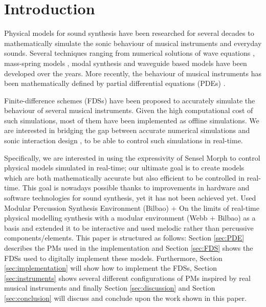 \documentclass{article}
\title{\papertitle}
\begin{document}
%
\capstartfalse
\maketitle
\capstarttrue
%
\begin{abstract}
In this paper we introduce several physical models of bowed string instruments which use accurate numerical simulations using partial differential equations but are also efficient enough to run in realtime. We describe the mathematical formulation of these models, the realtime implementation in JUCE, the control using the Sensel Morph interface as well as results from qualitative evaluations from experts.
\end{abstract}
%

\section{Introduction}\label{sec:introduction}

Physical models for sound synthesis have been researched for several decades to mathematically simulate the sonic behaviour of musical instruments and everyday sounds.
Several techniques ranging from numerical solutions of wave equations \cite{hiller1971synthesizing}, mass-spring models \cite{cadoz1993cordis}, modal synthesis \cite{morrison1993mosaic} and waveguide based models \cite{smith1992physical} have been developed over the years.
More recently, the behaviour of musical instruments has been mathematically defined by partial differential equations (PDEs) \cite{Bilbao2018:Tutorial}.

Finite-difference schemes (FDSs) have been proposed to accurately simulate the behaviour of several musical instruments.
Given the high computational cost of such simulations, most of them have been implemented as offline simulations.
We are interested in bridging the gap between accurate numerical simulations and sonic interaction design \cite{franinovic2013sonic}, to be able to control such simulations in real-time. 


Specifically, we are interested in using the expressivity of Sensel Morph \cite{sensel2018} to control physical models simulated in real-time; our ultimate goal is to create models which are both mathematically accurate but also efficient to be controlled in real-time. This goal is nowadays possible thanks to improvements in hardware and software technologies for sound synthesis, yet it has not been achieved yet.
Used Modular Percussion Synthesis Environment (Bilbao) + On the limits of real-time physical modelling synthesis with a modular environment (Webb + Bilbao) as a basis and extended it to be interactive and used melodic rather than percussive components/elements.
This paper is structured as follows: Section \ref{sec:PDE} describes the PMs used in the implementation and Section \ref{sec:FDS} shows the FDSs used to digitally implement these models. Furthermore, Section \ref{sec:implementation} will show how to implement the FDSs, Section \ref{sec:instruments} shows several different configurations of PMs inspired by real musical instruments and finally Section \ref{sec:discussion} and Section \ref{sec:conclusion} will discuss and conclude upon the work shown in this paper.
\end{document}
